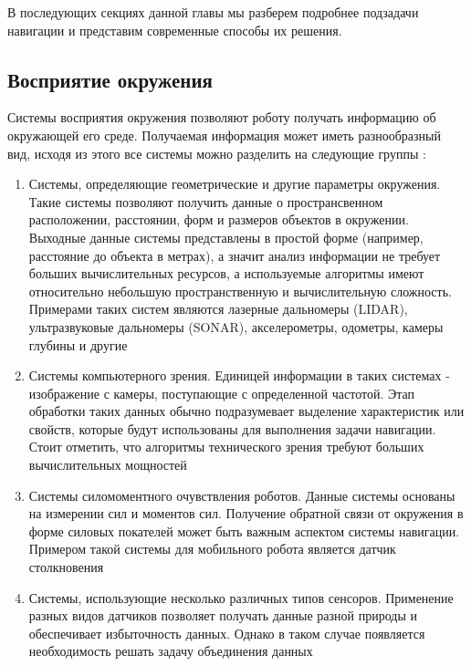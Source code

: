 В последующих секциях данной главы мы разберем подробнее подзадачи навигации и представим современные способы их решения.

\subsection{Восприятие окружения}
Системы восприятия окружения позволяют роботу получать информацию об окружающей его среде. Получаемая информация может иметь разнообразный вид, исходя из этого все системы можно разделить на следующие группы \cite{yurev_sensors}:
\begin{enumerate}
    \item Системы, определяющие геометрические и другие параметры окружения. Такие системы позволяют получить данные о пространсвенном расположении, расстоянии, форм и размеров объектов в окружении. Выходные данные системы представлены в простой форме (например, расстояние до объекта в метрах), а значит анализ информации не требует больших вычислительных ресурсов, а используемые алгоритмы имеют относительно небольшую пространственную и вычислительную сложность. Примерами таких систем являются лазерные дальномеры (LIDAR), ультразвуковые дальномеры (SONAR), акселерометры, одометры, камеры глубины и другие  
    \item Системы компьютерного зрения. Единицей информации в таких системах - изображение с камеры, поступающие с определенной частотой. Этап обработки таких данных обычно подразумевает выделение характеристик или свойств, которые будут использованы для выполнения задачи навигации. Стоит отметить, что алгоритмы технического зрения требуют больших вычислительных мощностей
    \item Системы силомоментного очувствления роботов. Данные системы основаны на измерении сил и моментов сил. Получение обратной связи от окружения в форме силовых покателей может быть важным аспектом системы навигации. Примером такой системы для мобильного робота является датчик столкновения 
    \item Системы, использующие несколько различных типов сенсоров. Применение разных видов датчиков позволяет получать данные разной природы и обеспечивает избыточность данных. Однако в таком случае появляется необходимость решать задачу объединения данных
\end{enumerate}

